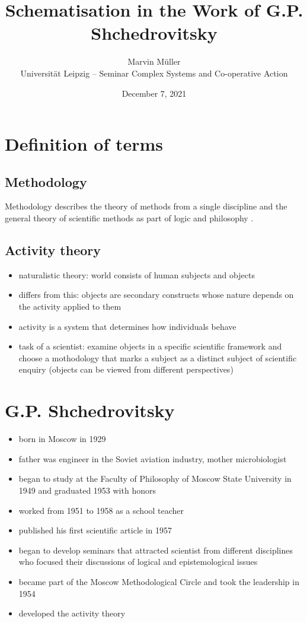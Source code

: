 \documentclass[11pt]{article}
\title{Schematisation in the Work of G.P. Shchedrovitsky}
\author{Marvin Müller\\[.3cm] Universität Leipzig -- Seminar Complex Systems
  and Co-operative Action }
\date{December 7, 2021}
\begin{document}
\maketitle

\section{Definition of terms}
\subsection{Methodology}
Methodology describes the theory of methods from a single discipline and the general theory of scientific methods as part of logic and philosophy \cite{2}. 

\subsection{Activity theory}
\begin{itemize}
	\setlength\itemsep{0em}
	\item naturalistic theory: world consists of human subjects and objects
	\item differs from this: objects are secondary constructs whose nature depends on the activity applied to them
	\item activity is a system that determines how individuals behave
	\item task of a scientist: examine objects in a specific scientific framework and choose a mothodology that marks a subject as a distinct subject of scientific enquiry (objects can be viewed from different perspectives) \cite{1}
\end{itemize}

\section{G.P. Shchedrovitsky}

\begin{itemize}
	\setlength\itemsep{0em}
	\item born in Moscow in 1929
	\item father was engineer in the Soviet aviation industry, mother microbiologist
	\item began to study at the Faculty of Philosophy of Moscow State University in 1949 and graduated 1953 with honors
	\item worked from 1951 to 1958 as a school teacher
	\item published his first scientific article in 1957
	\item began to develop seminars that attracted scientist from different disciplines who focused their discussions of logical and epistemological issues
	\item became part of the Moscow Methodological Circle and took the leadership in 1954
	\item developed the activity theory \cite{1}
\end{itemize}
\end{document}
